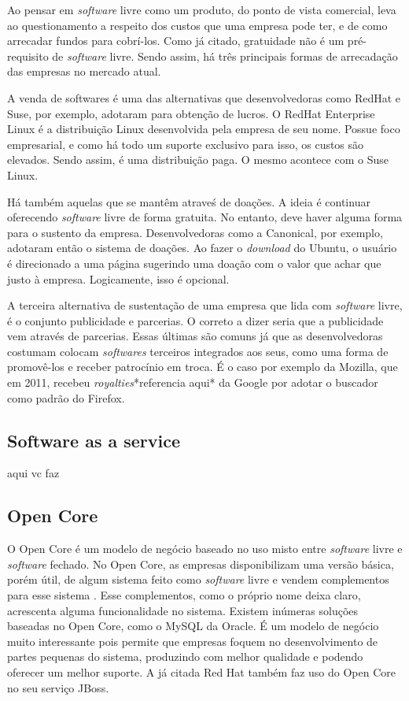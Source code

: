 \documentclass{classe_cn}                 %
\begin{document}
Ao pensar em \textit{software} livre como um produto, do ponto de vista comercial, leva ao questionamento a respeito dos custos que uma empresa pode ter, e de como arrecadar fundos para cobrí-los. Como já citado, gratuidade não é um pré-requisito de \textit{software} livre. Sendo assim, há três principais formas de arrecadação das empresas no mercado atual.

A venda de softwares é uma das alternativas que desenvolvedoras como RedHat e Suse, por exemplo, adotaram para obtenção de lucros. O RedHat Enterprise Linux é a distribuição Linux desenvolvida pela empresa de seu nome. Possue foco empresarial, e como há todo um suporte exclusivo para isso, os custos são elevados. Sendo assim, é uma distribuição paga. O mesmo acontece com o Suse Linux.

Há também aquelas que se mantêm atraveś de doações. A ideia é continuar oferecendo \textit{software} livre de forma gratuita. No entanto, deve haver alguma forma para o sustento da empresa. Desenvolvedoras como a Canonical, por exemplo, adotaram então o sistema de doações. Ao fazer o \textit{download} do Ubuntu, o usuário é direcionado a uma página sugerindo uma doação com o valor que achar que justo à empresa. Logicamente, isso é opcional.

A terceira alternativa de sustentação de uma empresa que lida com \textit{software} livre, é o conjunto publicidade e parcerias. O correto a dizer seria que a publicidade vem através de parcerias. Essas últimas são comuns já que as desenvolvedoras costumam colocam \textit{softwares} terceiros integrados aos seus, como uma forma de promovê-los e receber patrocínio em troca. É o caso por exemplo da Mozilla, que em 2011, recebeu \textit{royalties}*referencia aqui* da Google por adotar o buscador como padrão do Firefox.

\subsection{Software as a service}

aqui vc faz

\subsection{Open Core}

O Open Core é um modelo de negócio baseado no uso misto entre \textit{software} livre e \textit{software} fechado. No Open Core, as empresas disponibilizam uma versão básica, porém útil, de algum sistema feito como \textit{software} livre e vendem complementos para esse sistema \cite{riehle2012single}. Esse complementos, como o próprio nome deixa claro, acrescenta alguma funcionalidade no sistema. Existem inúmeras soluções baseadas no Open Core, como o MySQL da Oracle. É um modelo de negócio muito interessante pois permite que empresas foquem no desenvolvimento de partes pequenas do sistema, produzindo com melhor qualidade e podendo oferecer um melhor suporte.
A já citada Red Hat também faz uso do Open Core no seu serviço JBoss. 
\end{document}
